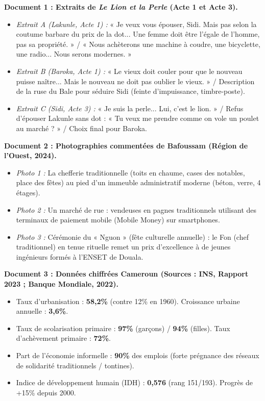 \documentclass[11pt]{article}
\begin{document}
\noindent \textbf{Document 1 : Extraits de \emph{Le Lion et la Perle} (Acte 1 et Acte 3).}
\begin{itemize}
    \item \textit{Extrait A (Lakunle, Acte 1) :} « Je veux vous épouser, Sidi. Mais pas selon la coutume barbare du prix de la dot... Une femme doit être l'égale de l'homme, pas sa propriété. » / « Nous achèterons une machine à coudre, une bicyclette, une radio... Nous serons modernes. »
    \item \textit{Extrait B (Baroka, Acte 1) :} « Le vieux doit couler pour que le nouveau puisse naître... Mais le nouveau ne doit pas oublier le vieux. » / Description de la ruse du Bale pour séduire Sidi (feinte d'impuissance, timbre-poste).
    \item \textit{Extrait C (Sidi, Acte 3) :} « Je suis la perle... Lui, c'est le lion. » / Refus d'épouser Lakunle sans dot : « Tu veux me prendre comme on vole un poulet au marché ? » / Choix final pour Baroka.
\end{itemize}

\noindent \textbf{Document 2 : Photographies commentées de Bafoussam (Région de l'Ouest, 2024).}
\begin{itemize}
    \item \textit{Photo 1 :} La chefferie traditionnelle (toits en chaume, cases des notables, place des fêtes) au pied d'un immeuble administratif moderne (béton, verre, 4 étages).
    \item \textit{Photo 2 :} Un marché de rue : vendeuses en pagnes traditionnels utilisant des terminaux de paiement mobile (Mobile Money) sur smartphones.
    \item \textit{Photo 3 :} Cérémonie du « Nguon » (fête culturelle annuelle) : le Fon (chef traditionnel) en tenue rituelle remet un prix d'excellence à de jeunes ingénieurs formés à l'ENSET de Douala.
\end{itemize}

\noindent \textbf{Document 3 : Données chiffrées Cameroun (Sources : INS, Rapport 2023 ; Banque Mondiale, 2022).}
\begin{itemize}
    \item Taux d'urbanisation : \textbf{58,2\%} (contre 12\% en 1960). Croissance urbaine annuelle : \textbf{3,6\%}.
    \item Taux de scolarisation primaire : \textbf{97\%} (garçons) / \textbf{94\%} (filles). Taux d'achèvement primaire : \textbf{72\%}.
    \item Part de l'économie informelle : \textbf{90\%} des emplois (forte prégnance des réseaux de solidarité traditionnels / tontines).
    \item Indice de développement humain (IDH) : \textbf{0,576} (rang 151/193). Progrès de +15\% depuis 2000.
\end{itemize}
\end{document}
